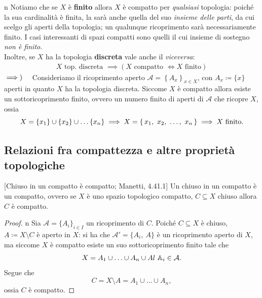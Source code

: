 \begin{remark}{n}
Notiamo che se $X$ è \textbf{finito} allora $X$ è compatto per \textit{qualsiasi} topologia: poiché la sua cardinalità è finita, la sarà anche quella del suo \textit{insieme delle parti}, da cui scelgo gli aperti della topologia; un qualunque ricoprimento sarà necessariamente finito. I casi interessanti di spazi compatti sono quelli il cui insieme di sostegno \textit{non è finito}.\\
Inoltre, se $X$ ha la topologia \textbf{discreta} vale anche il \textit{viceversa}:
	\begin{gather*}
		X \text{ top. discreta } \implies \left( X \text{ compatto } \iff X \text{ finito}\right)
	\end{gather*}
$\implies)\quad$ Consideriamo il ricoprimento aperto $\mathcal{A}=\left\{ A_x\right\}_{x\in X}$, con $A_x\coloneqq \{x\}$ aperti in quanto $X$ ha la topologia discreta. Siccome $X$ è compatto allora esiste un sottoricoprimento finito, ovvero un numero finito di aperti di $\mathcal{A}$ che ricopre $X$, ossia
\begin{equation*}
	X=\{x_1\}\cup\{x_2\}\cup\ldots\{x_n\}\implies X=\Set{x_1,\ x_2,\ \ldots,\ x_n}\implies X \text{ finito.}
\end{equation*}

\end{remark}
\subsection{Relazioni fra compattezza e altre proprietà topologiche}
\begin{theorem}{}[Chiuso in un compatto è compatto; Manetti, 4.41.1]\label{chiuso in compatto}
Un chiuso in un compatto è un compatto, ovvero se $X$ è uno spazio topologico compatto, $C\subseteq X$ chiuso allora $C$ è compatto.
\end{theorem}
\begin{proof}{n}
	Sia $\mathcal{A}=\{A_i \}_{i\in I}$ un ricoprimento di $C$. Poiché $C\subseteq X$ è chiuso, $A\coloneqq X\setminus C$ è aperto in $X$: si ha che $\mathcal{A}'=\{A_i,\ A\}$ è un ricoprimento aperto di $X$, ma siccome $X$ è compatto esiste un suo sottoricoprimento finito tale che
		\begin{equation*}
			X=A_1\cup\ldots\cup A_n\cup Al\ \A_i\in\mathcal{A}.
		\end{equation*}
	Segue che
	\begin{equation*}
		C=X\setminus A=A_1\cup\ldots\cup A_n,
	\end{equation*}
	ossia $C$ è compatto.\qedhere
\end{proof}

